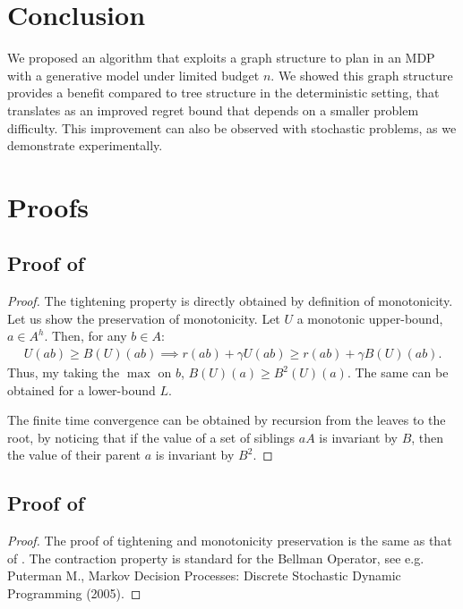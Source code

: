 \documentclass[runningheads]{llncs}
\begin{document}
\section*{Conclusion}

We proposed an algorithm that exploits a graph structure to plan in an MDP with a generative model under limited budget $n$. We showed this graph structure provides a benefit compared to tree structure in the deterministic setting, that translates as an improved regret bound that depends on a smaller problem difficulty. This improvement can also be observed with stochastic problems, as we demonstrate experimentally.

\FloatBarrier


\clearpage
\appendix

\section{Proofs}

\subsection{Proof of }
\begin{proof}
The tightening property is directly obtained by definition of monotonicity.
Let us show the preservation of monotonicity. Let $U$ a monotonic upper-bound, $a\in A^h$. Then, for any $b\in A$:
\begin{align*}
U(ab) \geq B(U)(ab) \implies 
r(ab) + \gamma U(ab) \geq r(ab) + \gamma B(U)(ab).
\end{align*}
Thus, my taking the $\max$ on $b$,
$
B(U)(a) \geq B^2(U)(a).
$
The same can be obtained for a lower-bound $L$.

The finite time convergence can be obtained by recursion from the leaves to the root, by noticing that if the value of a set of siblings $aA$ is invariant by $B$, then the value of their parent $a$ is invariant by $B^2$.
\end{proof}

\subsection{Proof of }
\begin{proof}
The proof of tightening and monotonicity preservation is the same as that of .
The contraction property is standard for the Bellman Operator, see e.g. Puterman M., Markov Decision Processes: Discrete Stochastic Dynamic Programming (2005).
\end{proof}
\end{document}
